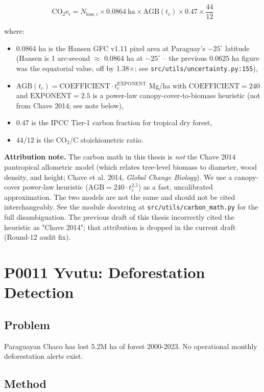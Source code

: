 \documentclass[12pt,a4paper,oneside]{book}
\begin{document}
$$\mathrm{CO}_2\mathrm{e}_i = N_{\mathrm{loss},i} \times 0.0864\ \mathrm{ha} \times \mathrm{AGB}(t_c) \times 0.47 \times \frac{44}{12}$$

where:
\begin{itemize}
  \item $0.0864$ ha is the Hansen GFC v1.11 pixel area at Paraguay's $-25^\circ$ latitude (Hansen is 1 arc-second $\approx$ 0.0864 ha at $-25^\circ$ -- the previous $0.0625$ ha figure was the equatorial value, off by 1.38$\times$; see \texttt{src/utils/uncertainty.py:155}),
  \item $\mathrm{AGB}(t_c) = \mathrm{COEFFICIENT} \cdot t_c^{\mathrm{EXPONENT}}$ Mg/ha with $\mathrm{COEFFICIENT}=240$ and $\mathrm{EXPONENT}=2.5$ is a power-law canopy-cover-to-biomass heuristic (not from Chave 2014; see note below),
  \item $0.47$ is the IPCC Tier-1 carbon fraction for tropical dry forest,
  \item $44/12$ is the CO$_2$/C stoichiometric ratio.
\end{itemize}

\textbf{Attribution note.} The carbon math in this thesis is \emph{not} the Chave 2014 pantropical allometric model (which relates tree-level biomass to diameter, wood density, and height; Chave et al. 2014, \textit{Global Change Biology}). We use a canopy-cover power-law heuristic ($\mathrm{AGB} = 240 \cdot t_c^{2.5}$) as a fast, uncalibrated approximation. The two models are not the same and should not be cited interchangeably. See the module docstring at \texttt{src/utils/carbon\_math.py} for the full disambiguation. The previous draft of this thesis incorrectly cited the heuristic as "Chave 2014"; that attribution is dropped in the current draft (Round-12 audit fix).

\chapter{P0011 Yvutu: Deforestation Detection}
\label{ch:p0011}

\section{Problem}

Paraguayan Chaco has lost 5.2M ha of forest 2000-2023. No operational monthly deforestation alerts exist.

\section{Method}
\end{document}
